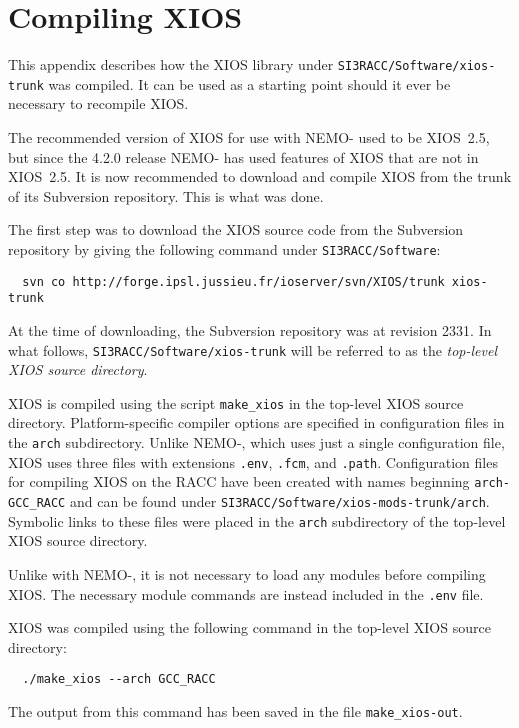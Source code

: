 \section{Compiling XIOS}
\label{sec:xios}

This appendix describes how the XIOS library under \verb|SI3RACC/Software/xios-trunk| was compiled.
It can be used as a starting point should it ever be necessary to recompile XIOS.

The recommended version of XIOS for use with NEMO-\SIcu{} used to be XIOS~2.5, but since the 4.2.0 release NEMO-\SIcu{} has used features of XIOS that are not in XIOS~2.5.
It is now recommended to download and compile XIOS from the trunk of its Subversion repository.
This is what was done.

The first step was to download the XIOS source code from the Subversion repository by giving the following command under \verb|SI3RACC/Software|:

\begin{verbatim}
  svn co http://forge.ipsl.jussieu.fr/ioserver/svn/XIOS/trunk xios-trunk
\end{verbatim}

\noindent{}At the time of downloading, the Subversion repository was at revision 2331.
In what follows, \verb|SI3RACC/Software/xios-trunk| will be referred to as the \textit{top-level XIOS source directory}.

XIOS is compiled using the script \verb|make_xios| in the top-level XIOS source directory.
Platform-specific compiler options are specified in configuration files in the \verb|arch| subdirectory.
Unlike NEMO-\SIcu{}, which uses just a single configuration file, XIOS uses three files with extensions \verb|.env|, \verb|.fcm|, and \verb|.path|.
Configuration files for compiling XIOS on the RACC have been created with names beginning \verb|arch-GCC_RACC| and can be found under \verb|SI3RACC/Software/|\linebreak\verb|xios-mods-trunk/arch|.
Symbolic links to these files were placed in the \verb|arch| subdirectory of the top-level XIOS source directory.

Unlike with NEMO-\SIcu{}, it is not necessary to load any modules before compiling XIOS.
The necessary module commands are instead included in the \verb|.env| file.

XIOS was compiled using the following command in the top-level XIOS source directory:

\begin{verbatim}
  ./make_xios --arch GCC_RACC
\end{verbatim}

\noindent{}The output from this command has been saved in the file \verb|make_xios-out|.

